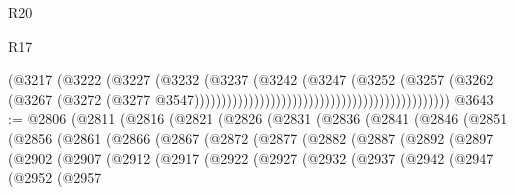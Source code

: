 \begin{lexlean}{R20}
\begin{lexlean}{R17}
\begin{coremodule}
{{{{{{{{{{{{{{{{{{{{{{{{{{{{{{{{{{{{{{{{{{{{{{{{{{{{{{{{{{{{{{{{{{{{{{{{{{{{{{{{{{{{{{{{{{{{{{{{{{{{{{{{{{{                                                                        (@3217
                                                                          (@3222
                                                                            (@3227
                                                                              (@3232
                                                                                (@3237
                                                                                  (@3242
                                                                                    (@3247
                                                                                      (@3252
                                                                                        (@3257
                                                                                          (@3262
                                                                                            (@3267
                                                                                              (@3272
                                                                                                (@3277
                                                                                                  @3547)))))))))))))))))))))))))))))))))))))))))))))))
@3643 := @2806
    (@2811
      (@2816
        (@2821
          (@2826
            (@2831
              (@2836
                (@2841
                  (@2846
                    (@2851
                      (@2856
                        (@2861
                          (@2866
                            (@2867
                              (@2872
                                (@2877
                                  (@2882
                                    (@2887
                                      (@2892
                                        (@2897
                                          (@2902
                                            (@2907
                                              (@2912
                                                (@2917
                                                  (@2922
                                                    (@2927
                                                      (@2932
                                                        (@2937
                                                          (@2942
                                                            (@2947
                                                              (@2952
                                                                (@2957
}}}}}}}}}}}}}}}}}}}}}}}}}}}}}}}}}}}}}}}}}}}}}}}}}}}}}}}}}}}}}}}}}}}}}}}}}}}}}}}}}}}}}}}}}}}}}}}}}}}}}}}}}}}
\end{coremodule}
\end{lexlean}
\end{lexlean}
